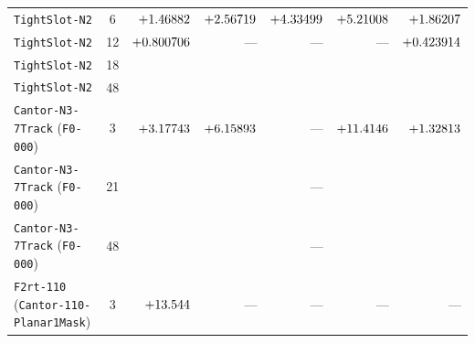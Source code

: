 \begin{table}[!htbp]
{\begin{tabular}{lcrrrrr}
\texttt{TightSlot-N2} & 6 & $+1.46882{}$ & $+2.56719{}$ & $+4.33499{}$ & $+5.21008{}$ & $+1.86207{}$ \\
\texttt{TightSlot-N2} & 12 & $+0.800706{}$ & --- & --- & --- & $+0.423914{}$ \\
\texttt{TightSlot-N2} & 18 & \RotCfourTightslotNtwoThetaOneeightStepThreeFNetPn{} & \RotCfourTightslotNtwoHighThetaZerooneeightpzeroVectorDyadicFZPn{} & \RotCfourTightslotNtwoUltraHighThetaZerooneeightpzeroVectorDyadicFZPn{} & \RotCfourTightslotNtwoHighThetaZerooneeightpzeroScalarYukawaFZPn{} & \RotCfourTightslotNtwoMeepThetaoneeightFZPn{} \\
\texttt{TightSlot-N2} & 48 & \RotCfourTightslotNtwoThetaFoureightStepEightFNetPn{} & \RotCfourTightslotNtwoHighThetaZerofoureightpzeroVectorDyadicFZPn{} & \RotCfourTightslotNtwoUltraHighThetaZerofoureightpzeroVectorDyadicFZPn{} & \RotCfourTightslotNtwoHighThetaZerofoureightpzeroScalarYukawaFZPn{} & \RotCfourTightslotNtwoMeepThetafoureightFZPn{} \\
\texttt{Cantor-N3-7Track} (\texttt{F0-000}) & 3 & $+3.17743{}$ & $+6.15893{}$ & --- & $+11.4146{}$ & $+1.32813{}$ \\
\texttt{Cantor-N3-7Track} (\texttt{F0-000}) & 21 & \RotConezeroFractalNthreeStandardThetaZerotwoonepzeroVectorDyadicFZPn{} & \RotConezeroFractalNthreeHighThetaZerotwoonepzeroVectorDyadicFZPn{} & --- & \RotConezeroFractalNthreeHighThetaZerotwoonepzeroScalarYukawaFZPn{} & \RotConezeroFractalNthreeMeepThetatwooneFZPn{} \\
\texttt{Cantor-N3-7Track} (\texttt{F0-000}) & 48 & \RotConezeroFractalNthreeStandardThetaZerofoureightpzeroVectorDyadicFZPn{} & \RotConezeroFractalNthreeHighThetaZerofoureightpzeroVectorDyadicFZPn{} & --- & \RotConezeroFractalNthreeHighThetaZerofoureightpzeroScalarYukawaFZPn{} & \RotConezeroFractalNthreeMeepThetafoureightFZPn{} \\
\midrule
\texttt{F2rt-110} (\texttt{Cantor-110-Planar1Mask}) & 3 & $+\roundfour{\NthreeUnithreedFoneonezeroRthetaPlanarFzPn}$ & --- & --- & --- & --- \\

\end{tabular}}
\end{table}
